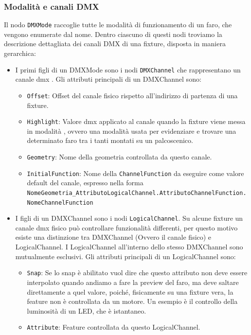 \documentclass[main.tex]{subfiles}
\begin{document}
\subsubsection{Modalità e canali DMX}\label{subsec:1_2_dmxchannels}
Il nodo \lstinline{DMXMode} raccoglie tutte le modalità di funzionamento di un faro, che vengono enumerate dal nome. Dentro ciascuno di questi nodi troviamo la descrizione dettagliata dei canali DMX di una fixture, disposta in maniera gerarchica:
\begin{itemize}
    \item I primi figli di un DMXMode sono i nodi \lstinline{DMXChannel} che rappresentano un canale dmx . Gli attributi principali di un DMXChannel sono: \begin{itemize}
            \item \lstinline{Offset}: Offset del canale fisico rispetto all'indirizzo di partenza di una fixture.
            \item \lstinline{Highlight}: Valore dmx applicato al canale quando la fixture viene messa in modalità , ovvero una modalità usata per evidenziare e trovare una determinato faro tra i tanti montati su un palcoscenico.
            \item \lstinline{Geometry}: Nome della geometria controllata da questo canale.
            \item \lstinline{InitialFunction}: Nome della \lstinline{ChannelFunction} da eseguire come valore default del canale, espresso nella forma \lstinline{NomeGeometria_AttributoLogicalChannel.AttributoChannelFunction.NomeChannelFunction}
        \end{itemize}
    \item I figli di un DMXChannel sono i nodi \lstinline{LogicalChannel}. Su alcune fixture un canale dmx fisico può controllare funzionalità differenti, per questo motivo esiste una distinzione tra DMXChannel (Ovvero il canale fisico) e LogicalChannel. I LogicalChannel all'interno dello stesso DMXChannel sono mutualmente esclusivi. Gli attributi principali di un LogicalChannel sono: \begin{itemize}
            \item \lstinline{Snap}: Se lo snap è abilitato vuol dire che questo attributo non deve essere interpolato quando andiamo a fare la preview del faro, ma deve saltare direttamente a quel valore, poiché, fisicamente su una fixture vera, la feature non è controllata da un motore. Un esempio è il controllo della luminosità di un LED, che è istantaneo.
            \item \lstinline{Attribute}: Feature controllata da questo LogicalChannel.

\end{itemize}
\end{itemize}
\end{document}
